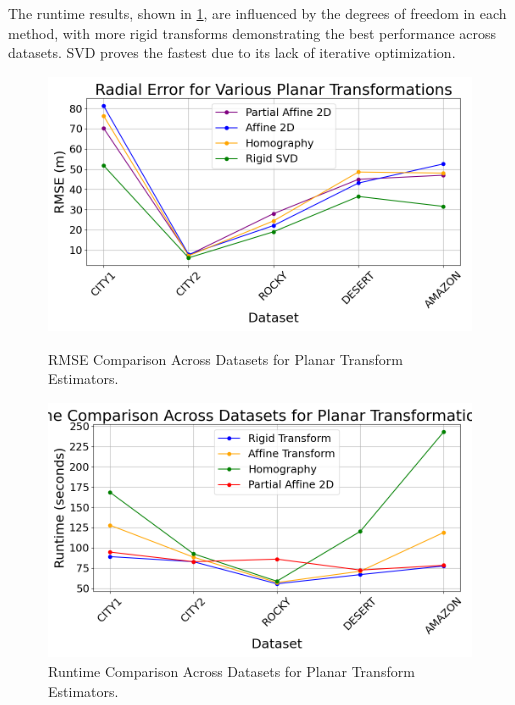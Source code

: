 The runtime results, shown in \ref{fig:runtime_comparison_rotestim}, are influenced by the degrees of freedom in each method, with more rigid transforms demonstrating the best performance across datasets. SVD proves the fastest due to its lack of iterative optimization.


\begin{figure}[H]
    \centering
    \begin{minipage}{0.45\textwidth}
        \centering
        \includegraphics[width=\textwidth]{./Chapter 4/testresults/rmse_planar_estimators.png}
        \caption{RMSE Comparison Across Datasets for Planar Transform Estimators.}
        \label{fig:rmse_comparison_rotestim}
    \end{minipage}\hfill
    \begin{minipage}{0.45\textwidth}
        \centering
        \includegraphics[width=\textwidth]{./Chapter 4/testresults/runtime_planar_estimators.png}
        \caption{Runtime Comparison Across Datasets for Planar Transform Estimators.}
        \label{fig:runtime_comparison_rotestim}
    \end{minipage}
\end{figure}
   
